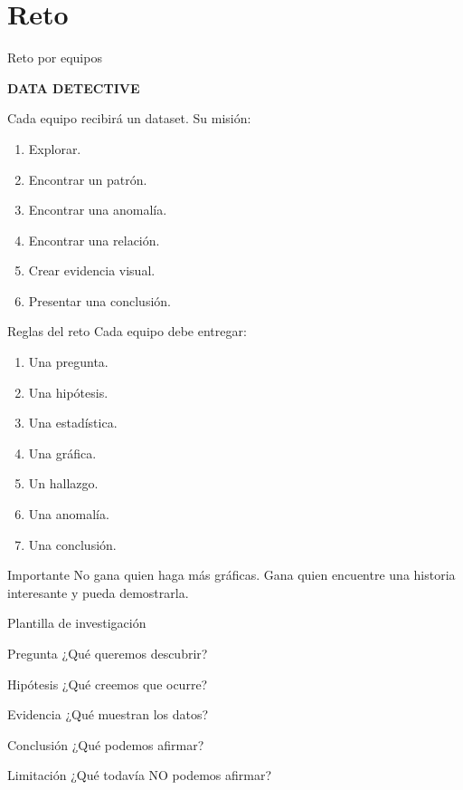\documentclass[aspectratio=169,11pt]{beamer}
\begin{document}
\section{Reto}
\begin{frame}{Reto por equipos}
\begin{center}
\Huge
\textbf{DATA DETECTIVE}
\end{center}
\vspace{0.4cm}
Cada equipo recibirá un dataset.
Su misión:
\begin{enumerate}
    \item Explorar.
    \item Encontrar un patrón.
    \item Encontrar una anomalía.
    \item Encontrar una relación.
    \item Crear evidencia visual.
    \item Presentar una conclusión.
\end{enumerate}
\end{frame}
\begin{frame}{Reglas del reto}
Cada equipo debe entregar:
\begin{enumerate}
    \item Una pregunta.
    \item Una hipótesis.
    \item Una estadística.
    \item Una gráfica.
    \item Un hallazgo.
    \item Una anomalía.
    \item Una conclusión.
\end{enumerate}
\begin{alertblock}{Importante}
No gana quien haga más gráficas.
Gana quien encuentre una historia interesante y pueda demostrarla.
\end{alertblock}
\end{frame}
\begin{frame}{Plantilla de investigación}
\begin{block}{Pregunta}
¿Qué queremos descubrir?
\end{block}
\begin{block}{Hipótesis}
¿Qué creemos que ocurre?
\end{block}
\begin{block}{Evidencia}
¿Qué muestran los datos?
\end{block}
\begin{block}{Conclusión}
¿Qué podemos afirmar?
\end{block}
\begin{block}{Limitación}
¿Qué todavía NO podemos afirmar?
\end{block}
\end{frame}
\end{document}
